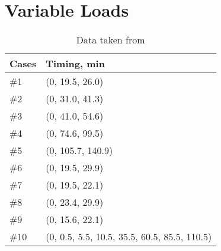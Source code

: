 \chapter{Variable Loads}\label{cp:VL}
\begin{table}[]
\centering
\label{variable_loads_list}
\begin{tabular}{|l|l|}
\hline
Cases & Timing, min \\ \hline
\rowcolor[HTML]{EFEFEF} 
\#1 & (0, 19.5, 26.0) \\ \hline
\#2 & (0, 31.0, 41.3) \\ \hline
\rowcolor[HTML]{EFEFEF} 
\#3 & (0, 41.0, 54.6) \\ \hline
\#4 & (0, 74.6, 99.5) \\ \hline
\rowcolor[HTML]{EFEFEF} 
\#5 & (0, 105.7, 140.9) \\ \hline
\#6 & (0, 19.5, 29.9) \\ \hline
\rowcolor[HTML]{EFEFEF} 
\#7 & (0, 19.5, 22.1) \\ \hline
\#8 & (0, 23.4, 29.9) \\ \hline
\rowcolor[HTML]{EFEFEF} 
\#9 & (0, 15.6, 22.1) \\ \hline
\#10 & (0, 0.5, 5.5, 10.5, 35.5, 60.5, 85.5, 110.5) \\ \hline
\end{tabular}
\caption{Data taken from \cite{battery_model}}
\end{table}